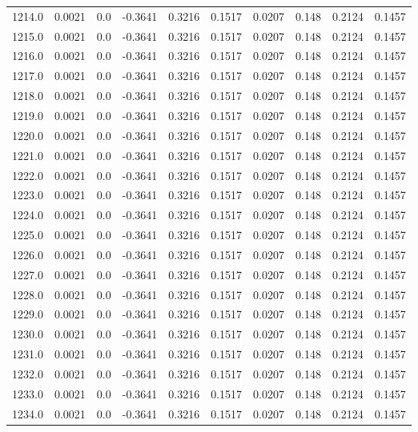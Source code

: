 \begin{longtable}{lrrrrrrrrr}
1214.0 & 0.0021 & 0.0 & -0.3641 & 0.3216 & 0.1517 & 0.0207 & 0.148 & 0.2124 & 0.1457 \\
1215.0 & 0.0021 & 0.0 & -0.3641 & 0.3216 & 0.1517 & 0.0207 & 0.148 & 0.2124 & 0.1457 \\
1216.0 & 0.0021 & 0.0 & -0.3641 & 0.3216 & 0.1517 & 0.0207 & 0.148 & 0.2124 & 0.1457 \\
1217.0 & 0.0021 & 0.0 & -0.3641 & 0.3216 & 0.1517 & 0.0207 & 0.148 & 0.2124 & 0.1457 \\
1218.0 & 0.0021 & 0.0 & -0.3641 & 0.3216 & 0.1517 & 0.0207 & 0.148 & 0.2124 & 0.1457 \\
1219.0 & 0.0021 & 0.0 & -0.3641 & 0.3216 & 0.1517 & 0.0207 & 0.148 & 0.2124 & 0.1457 \\
1220.0 & 0.0021 & 0.0 & -0.3641 & 0.3216 & 0.1517 & 0.0207 & 0.148 & 0.2124 & 0.1457 \\
1221.0 & 0.0021 & 0.0 & -0.3641 & 0.3216 & 0.1517 & 0.0207 & 0.148 & 0.2124 & 0.1457 \\
1222.0 & 0.0021 & 0.0 & -0.3641 & 0.3216 & 0.1517 & 0.0207 & 0.148 & 0.2124 & 0.1457 \\
1223.0 & 0.0021 & 0.0 & -0.3641 & 0.3216 & 0.1517 & 0.0207 & 0.148 & 0.2124 & 0.1457 \\
1224.0 & 0.0021 & 0.0 & -0.3641 & 0.3216 & 0.1517 & 0.0207 & 0.148 & 0.2124 & 0.1457 \\
1225.0 & 0.0021 & 0.0 & -0.3641 & 0.3216 & 0.1517 & 0.0207 & 0.148 & 0.2124 & 0.1457 \\
1226.0 & 0.0021 & 0.0 & -0.3641 & 0.3216 & 0.1517 & 0.0207 & 0.148 & 0.2124 & 0.1457 \\
1227.0 & 0.0021 & 0.0 & -0.3641 & 0.3216 & 0.1517 & 0.0207 & 0.148 & 0.2124 & 0.1457 \\
1228.0 & 0.0021 & 0.0 & -0.3641 & 0.3216 & 0.1517 & 0.0207 & 0.148 & 0.2124 & 0.1457 \\
1229.0 & 0.0021 & 0.0 & -0.3641 & 0.3216 & 0.1517 & 0.0207 & 0.148 & 0.2124 & 0.1457 \\
1230.0 & 0.0021 & 0.0 & -0.3641 & 0.3216 & 0.1517 & 0.0207 & 0.148 & 0.2124 & 0.1457 \\
1231.0 & 0.0021 & 0.0 & -0.3641 & 0.3216 & 0.1517 & 0.0207 & 0.148 & 0.2124 & 0.1457 \\
1232.0 & 0.0021 & 0.0 & -0.3641 & 0.3216 & 0.1517 & 0.0207 & 0.148 & 0.2124 & 0.1457 \\
1233.0 & 0.0021 & 0.0 & -0.3641 & 0.3216 & 0.1517 & 0.0207 & 0.148 & 0.2124 & 0.1457 \\
1234.0 & 0.0021 & 0.0 & -0.3641 & 0.3216 & 0.1517 & 0.0207 & 0.148 & 0.2124 & 0.1457 \\

\end{longtable}
